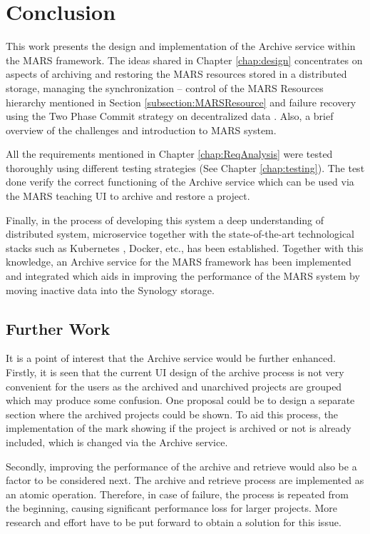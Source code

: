 \chapter{Conclusion}
This work presents the design and implementation of the Archive service within the MARS framework. The ideas shared
in Chapter \ref{chap:design} concentrates on aspects of archiving and restoring the MARS resources stored in a distributed storage, managing the synchronization
-- control of the MARS Resources hierarchy mentioned in Section \ref{subsection:MARSResource} and failure recovery using the Two Phase Commit strategy
on decentralized data \cite{atomic}.
Also, a brief overview of the challenges and introduction to MARS system.

All the requirements mentioned in Chapter \ref{chap:ReqAnalysis} were tested thoroughly using different testing strategies (See Chapter \ref{chap:testing}). The
test done verify the correct functioning of the Archive service which can be used via the MARS teaching UI to archive and restore a project.

Finally, in the process of developing this system a deep understanding of distributed system, microservice together with the state-of-the-art technological stacks
such as Kubernetes \cite{kubernetes}, Docker, etc., has been established. Together with this knowledge, an Archive service for the MARS framework has been implemented and integrated 
which aids in improving the performance of the MARS system by moving inactive data into the Synology storage.

\section{Further Work}
It is a point of interest that the Archive service would be further enhanced. Firstly, it is seen that the current UI design of the archive process is 
not very convenient for the users as the archived and unarchived projects are grouped which may produce some confusion. One proposal could be to design a 
separate section where the archived projects could be shown. 
To aid this process, the implementation of the mark showing if the project is archived or not is already included, which is changed via the Archive service.

Secondly, improving the performance of the archive and retrieve would also be a factor to be considered next. The archive and retrieve process are implemented 
as an atomic operation. Therefore, in case of failure, the process is repeated 
from the beginning, causing significant performance loss for larger projects. More research and effort have to be put forward to obtain a solution for this issue.

